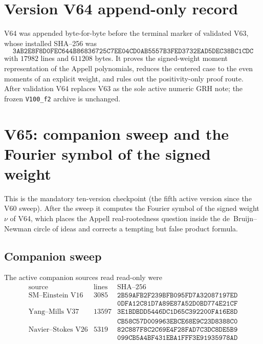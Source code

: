 \documentclass[11pt]{article}
\theoremstyle{definition}
\theoremstyle{remark}
\begin{document}
\section*{Version V64 append-only record}

V64 was appended byte-for-byte before the terminal marker of validated
V63, whose installed SHA--256 was
\[
 \texttt{3AB2E8F8D0FEC644B86836725C7EE04C}
 \allowbreak\texttt{D0AB5557B3FED3732EAD5DEC38BC1CDC}
\]
with \(17982\) lines and \(611208\) bytes.  It proves the signed-weight
moment representation of the Appell polynomials, reduces the centered
case to the even moments of an explicit weight, and rules out the
positivity-only proof route.  After validation V64 replaces V63 as the
sole active numeric GRH note; the frozen \texttt{V100\_f2} archive is
unchanged.





\clearpage
\section{V65: companion sweep and the Fourier symbol of the signed weight}
\label{sec:f2v65-fourier}
\begingroup
\setcounter{equation}{0}
\renewcommand{\theequation}{N65.\arabic{equation}}
\renewcommand{\theHequation}{f2v65.\arabic{equation}}

This is the mandatory ten-version checkpoint (the fifth active version
since the V60 sweep).  After the sweep it computes the Fourier symbol of
the signed weight \(\nu\) of V64, which places the Appell real-rootedness
question inside the de~Bruijn--Newman circle of ideas and corrects a
tempting but false product formula.

\subsection{Companion sweep}

The active companion sources read read-only were
\begin{equation}
\begin{array}{c|r|l}
\text{source}&\text{lines}&\text{SHA--256}\\ \hline
\text{SM--Einstein V16}&3085&
\texttt{2B59AFB2F239BFB095FD7A32087197ED}\\
&&\texttt{0DFA12C81D7A89E87A52D0BD774E21CF}\\
\text{Yang--Mills V37}&13597&
\texttt{3E1BDBDD5446DC1D65C392200FA16E8D}\\
&&\texttt{CB58C57D009963EBCE68E9C23D8388C0}\\
\text{Navier--Stokes V26}&5319&
\texttt{82C887F8C2C69E4F28FAD7C3DC8DE5B9}\\
&&\texttt{099CB5A4BF431EBA1FFF3E91935978AD}
\end{array}
\label{eq:f2v65-sources}
\end{equation}
\end{document}
